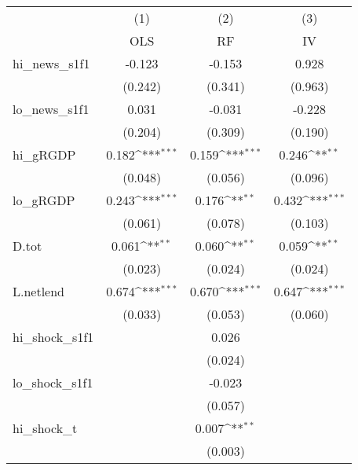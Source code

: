 {
\def\sym#1{\ifmmode^{#1}\else\(^{#1}\)\fi}
\begin{tabular}{l*{3}{c}}
\toprule
            &\multicolumn{1}{c}{(1)}&\multicolumn{1}{c}{(2)}&\multicolumn{1}{c}{(3)}\\
            &\multicolumn{1}{c}{OLS}&\multicolumn{1}{c}{RF}&\multicolumn{1}{c}{IV}\\
\midrule
hi\_news\_s1f1&      -0.123         &      -0.153         &       0.928         \\
            &     (0.242)         &     (0.341)         &     (0.963)         \\
\addlinespace
lo\_news\_s1f1&       0.031         &      -0.031         &      -0.228         \\
            &     (0.204)         &     (0.309)         &     (0.190)         \\
\addlinespace
hi\_gRGDP    &       0.182\sym{***}&       0.159\sym{***}&       0.246\sym{**} \\
            &     (0.048)         &     (0.056)         &     (0.096)         \\
\addlinespace
lo\_gRGDP    &       0.243\sym{***}&       0.176\sym{**} &       0.432\sym{***}\\
            &     (0.061)         &     (0.078)         &     (0.103)         \\
\addlinespace
D.tot       &       0.061\sym{**} &       0.060\sym{**} &       0.059\sym{**} \\
            &     (0.023)         &     (0.024)         &     (0.024)         \\
\addlinespace
L.netlend   &       0.674\sym{***}&       0.670\sym{***}&       0.647\sym{***}\\
            &     (0.033)         &     (0.053)         &     (0.060)         \\
\addlinespace
hi\_shock\_s1f1&                     &       0.026         &                     \\
            &                     &     (0.024)         &                     \\
\addlinespace
lo\_shock\_s1f1&                     &      -0.023         &                     \\
            &                     &     (0.057)         &                     \\
\addlinespace
hi\_shock\_t  &                     &       0.007\sym{**} &                     \\
            &                     &     (0.003)         &                     \\

\end{tabular}}
